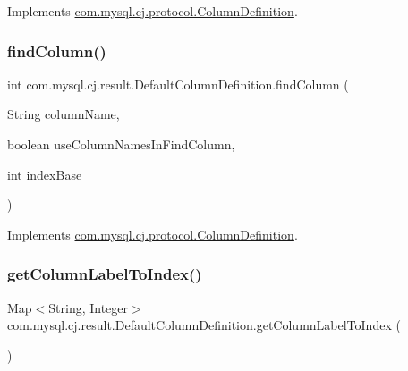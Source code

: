 Implements \mbox{\hyperlink{interfacecom_1_1mysql_1_1cj_1_1protocol_1_1_column_definition_ae382d41d473df7f74ce51d22c18b1aa6}{com.\+mysql.\+cj.\+protocol.\+Column\+Definition}}.

\mbox{\label{classcom_1_1mysql_1_1cj_1_1result_1_1_default_column_definition_ae73bfdbb03fe73c3a9b7687e4e987500}} 
\subsubsection{\texorpdfstring{find\+Column()}{findColumn()}}
{\footnotesize\ttfamily int com.\+mysql.\+cj.\+result.\+Default\+Column\+Definition.\+find\+Column (\begin{DoxyParamCaption}\item[{String}]{column\+Name,  }\item[{boolean}]{use\+Column\+Names\+In\+Find\+Column,  }\item[{int}]{index\+Base }\end{DoxyParamCaption})}



Implements \mbox{\hyperlink{interfacecom_1_1mysql_1_1cj_1_1protocol_1_1_column_definition_a9082cb797c01aec299496d0d2fe41528}{com.\+mysql.\+cj.\+protocol.\+Column\+Definition}}.

\mbox{\label{classcom_1_1mysql_1_1cj_1_1result_1_1_default_column_definition_a625450cf994980769ce878b7e8ede9b3}} 
\subsubsection{\texorpdfstring{get\+Column\+Label\+To\+Index()}{getColumnLabelToIndex()}}
{\footnotesize\ttfamily Map$<$String, Integer$>$ com.\+mysql.\+cj.\+result.\+Default\+Column\+Definition.\+get\+Column\+Label\+To\+Index (\begin{DoxyParamCaption}{ }\end{DoxyParamCaption})}



